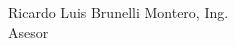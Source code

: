 \begin{center}
	\fontsize{11}{11}\selectfont
	Ricardo Luis Brunelli Montero, Ing.\\
	Asesor
\end{center}